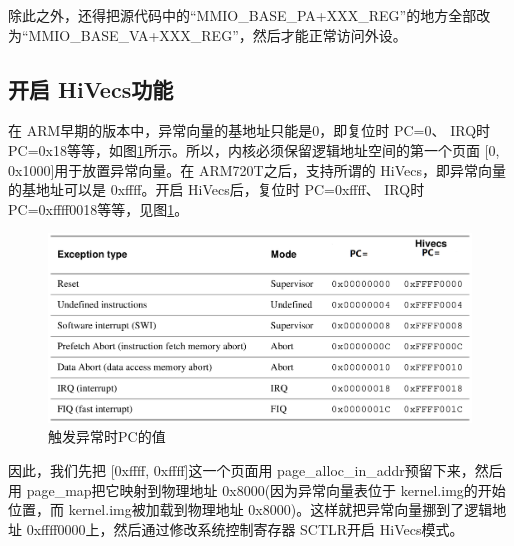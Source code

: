 \documentclass[main.tex]{subfiles}
\begin{document}
\begin{CJK*}{UTF8}{song}
\begin{code}
\label{code:4-27}
\inputminted[firstline=379,lastline=384,linenos,numbersep=5pt,frame=lines,framesep=2mm]{c}{src/chapter04/kernel/machdep.c}
\end{code}

除此之外，还得把源代码中的“MMIO\_\-BASE\_\-PA+XXX\_\-REG”的地方全部改为“MMIO\_\-BASE\_\-VA+XXX\_\-REG”，然后才能正常访问外设。

\subsection{开启 HiVecs功能}
在 ARM早期的版本中，异常向量的基地址只能是0，即复位时 PC=0、 IRQ时 PC=0x18等等，如图\ref{figure:4-8}所示。所以，内核必须保留逻辑地址空间的第一个页面 [0, 0x1000]用于放置异常向量。在 ARM\-720T之后，支持所谓的 Hi\-Vecs，即异常向量的基地址可以是 0xffff。开启 Hi\-Vecs后，复位时 PC=0xffff、 IRQ时 PC=0xffff\-0018等等，见图\ref{figure:4-8}。

\begin{figure}[htp]
\centering
\includegraphics[scale=0.3]{figures/4-8}
\caption{触发异常时PC的值}
\label{figure:4-8}
\end{figure}

因此，我们先把 [0xffff, 0xffff]这一个页面用 page\_\-alloc\_\-in\_\-addr预留下来，然后用 page\_\-map把它映射到物理地址 0x8000(因为异常向量表位于 kernel.img的开始位置，而 kernel.img被加载到物理地址 0x8000)。这样就把异常向量挪到了逻辑地址 0xffff\-0000上，然后通过修改系统控制寄存器 SCTLR开启 Hi\-Vecs模式。

\begin{code}
\label{code:4-28}
\inputminted[firstline=386,lastline=404,linenos,numbersep=5pt,frame=lines,framesep=2mm]{c}{src/chapter04/kernel/machdep.c}
\end{code}


\end{CJK*}
\end{document}
